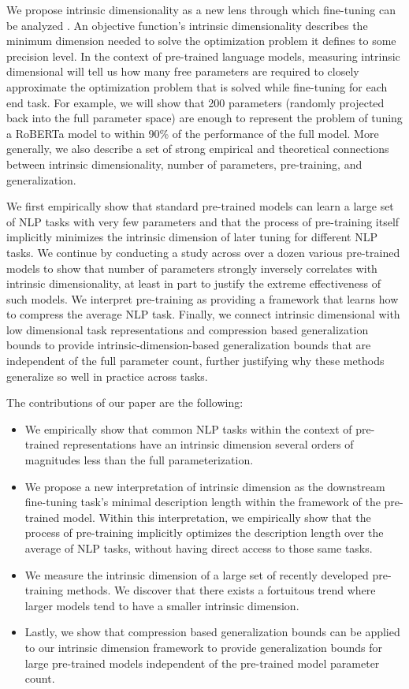 \documentclass{article} \usepackage{iclr2020_conference,times}
\begin{document}
We propose intrinsic dimensionality as a new lens through which fine-tuning can be analyzed \citep{intrinsic_dimension}. An objective function's intrinsic dimensionality describes the minimum dimension needed to solve the optimization problem it defines to some precision level. In the context of pre-trained language models, measuring intrinsic dimensional will tell us how many free parameters are required to closely approximate the optimization problem that is solved while fine-tuning for each end task. For example, we will show that 200 parameters (randomly projected back into the full parameter space) are enough to represent the problem of tuning a RoBERTa model to within 90\% of the performance of the full model. More generally, we also describe a set of strong empirical and theoretical connections between intrinsic dimensionality, number of parameters, pre-training, and generalization.

We first empirically show that standard pre-trained models can learn a large set of NLP tasks with very few parameters and that the process of pre-training itself implicitly minimizes the intrinsic dimension of later tuning for different NLP tasks. We continue by conducting a study across over a dozen various pre-trained models to show that number of parameters strongly inversely correlates with intrinsic dimensionality, at least in part to justify the extreme effectiveness of such models. We interpret pre-training as providing a framework that learns how to compress the average NLP task.  Finally, we connect intrinsic dimensional with low dimensional task representations and compression based generalization bounds to provide intrinsic-dimension-based generalization bounds that are independent of the full parameter count, further justifying why these methods generalize so well in practice across tasks.

The contributions of our paper are the following:
\begin{itemize}
\item We empirically show that common NLP tasks within the context of pre-trained representations have an intrinsic dimension several orders of magnitudes less than the full parameterization.
    \item We propose a new interpretation of intrinsic dimension as the downstream fine-tuning task's minimal description length within the framework of the pre-trained model. Within this interpretation, we empirically show that the process of pre-training implicitly optimizes the description length over the average of NLP tasks, without having direct access to those same tasks.
    \item We measure the intrinsic dimension of a large set of recently developed pre-training methods. We discover that there exists a  fortuitous trend where larger models tend to have a smaller intrinsic dimension.
    \item Lastly, we show that compression based generalization bounds can be applied to our intrinsic dimension framework to provide generalization bounds for large pre-trained models independent of the pre-trained model parameter count.
\end{itemize}
\end{document}
